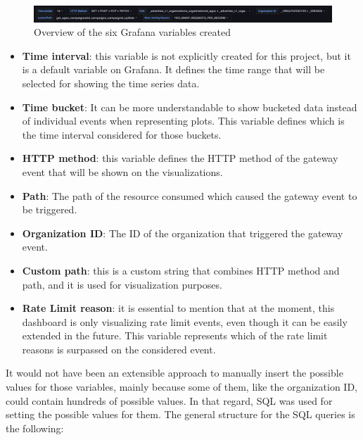 \documentclass[english, 12pt, a4paper, sci, utf8, a-1b, online]{aaltothesis}
\begin{document}
\begin{figure}[h!]
    \centering
    \includegraphics[scale=0.3]{src/thesis/img/technical-solution/grafana-dashboard/grafana-variables.png}
    \caption{Overview of the six Grafana variables created}
    \label{fig:grafana-vars}
\end{figure}

\begin{itemize}
    \item \textbf{Time interval}: this variable is not explicitly created for this project, but it is a default variable on Grafana. It defines the time range that will be selected for showing the time series data.
    \item \textbf{Time bucket}: It can be more understandable to show bucketed data instead of individual events when representing plots. This variable defines which is the time interval considered for those buckets.
    \item \textbf{HTTP method}: this variable defines the HTTP method of the gateway event that will be shown on the visualizations.
    \item \textbf{Path}: The path of the resource consumed which caused the gateway event to be triggered.
    \item \textbf{Organization ID}: The ID of the organization that triggered the gateway event.
    \item \textbf{Custom path}: this is a custom string that combines HTTP method and path, and it is used for visualization purposes.
    \item \textbf{Rate Limit reason}: it is essential to mention that at the moment, this dashboard is only visualizing rate limit events, even though it can be easily extended in the future. This variable represents which of the rate limit reasons is surpassed on the considered event.
\end{itemize}

It would not have been an extensible approach to manually insert the possible values for those variables, mainly because some of them, like the organization ID, could contain hundreds of possible values. In that regard, SQL was used for setting the possible values for them. The general structure for the SQL queries is the following:\\
\end{document}
